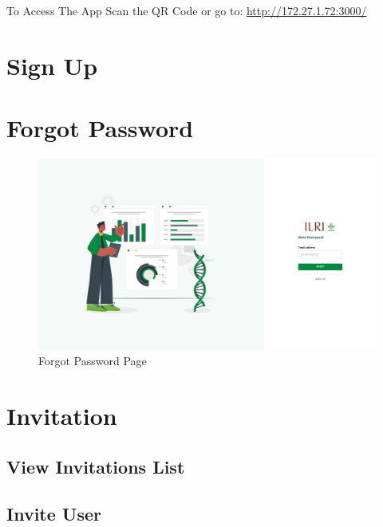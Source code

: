 \documentclass[a4paper,12pt]{article}
\begin{document}
\begin{myremark}{To Access The App}\label{visite_site}
\vspace{10px}
Scan the QR Code or go to: \href{http://172.27.1.72:3000/}{http://172.27.1.72:3000/}

\vspace{20px}

\quad
{}
\end{myremark}

\newpage
\section{Sign Up}


\newpage


\newpage
\section{Forgot Password}
\begin{figure}[h!]
  	\includegraphics[width=15cm]{screenshots/forgot_password_page.png}
  	\caption{Forgot Password Page}
  	\label{fig:forgot_password_page}
\end{figure}

\section{Invitation}

\subsection{View Invitations List}
\subsection{Invite User}
\end{document}
